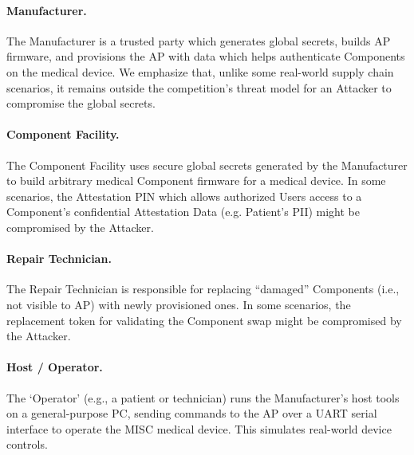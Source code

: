 \paragraph{Manufacturer.} The Manufacturer is a trusted party which generates global secrets, builds AP firmware, and provisions the AP with data which helps authenticate Components on the medical device. We emphasize that, unlike some real-world supply chain scenarios, it remains outside the competition's threat model for an Attacker to compromise the global secrets.

\paragraph{Component Facility.} The Component Facility uses secure global secrets generated by the Manufacturer to build arbitrary medical Component firmware for a medical device. In some scenarios, the Attestation PIN which allows authorized Users access to a Component's confidential Attestation Data (e.g. Patient's PII) might be compromised by the Attacker.

\paragraph{Repair Technician.} The Repair Technician is responsible for replacing ``damaged'' Components (i.e., not visible to AP) with newly provisioned ones. In some scenarios, the replacement token for validating the Component swap might be compromised by the Attacker.

\paragraph{Host / Operator.} The `Operator' (e.g., a patient or technician) runs the Manufacturer's host tools on a general-purpose PC, sending commands to the AP over a UART serial interface to operate the MISC medical device. This simulates real-world device controls.




